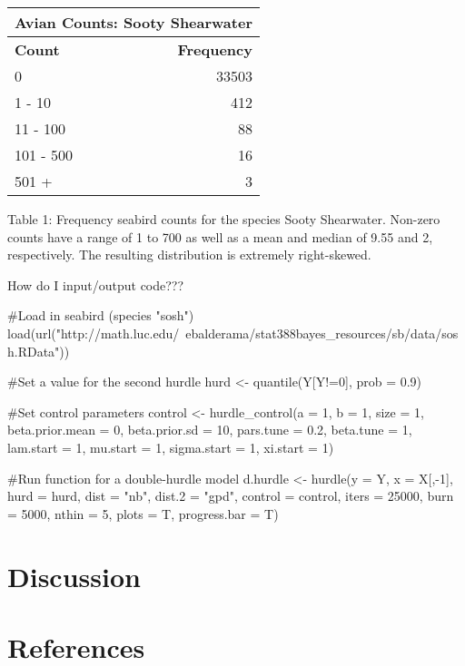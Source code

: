 \documentclass[article]{jss}
\begin{document}
\begin{tabular}{ |l|r| }
	\hline
	\multicolumn{2}{|c|}{\textbf{Avian Counts: Sooty Shearwater}} \\
	\hline
	\textbf{Count} &\textbf{ Frequency} \\ \hline
	0 & 33503 \\ \hline
	1 - 10 & 412 \\ \hline
	11 - 100 & 88 \\ \hline
	101 - 500 & 16 \\ \hline
	501 + & 3 \\ \hline
\end{tabular}

Table 1: Frequency seabird counts for the species Sooty Shearwater. Non-zero counts have a range of 1 to 700 as well as a mean and median of 9.55 and 2, respectively. The resulting distribution is extremely right-skewed.

How do I input/output code???

\begin{CodeChunk}
	\begin{CodeInput}
		
#Load in seabird (species "sosh")
load(url("http://math.luc.edu/~ebalderama/stat388bayes_resources/sb/data/sosh.RData"))

#Set a value for the second hurdle
hurd <- quantile(Y[Y!=0], prob = 0.9)

#Set control parameters		
control <- hurdle_control(a = 1, b = 1, size = 1, beta.prior.mean = 0, beta.prior.sd = 10, pars.tune = 0.2, beta.tune = 1, lam.start = 1, mu.start = 1, sigma.start = 1, xi.start = 1)

#Run function for a double-hurdle model
d.hurdle <- hurdle(y = Y, x = X[,-1], hurd = hurd, dist = "nb", dist.2 = "gpd", control = control, iters = 25000, burn = 5000, nthin = 5, plots = T, progress.bar = T)
	\end{CodeInput}
\end{CodeChunk}

\section{Discussion}


\section*{References}
\end{document}
